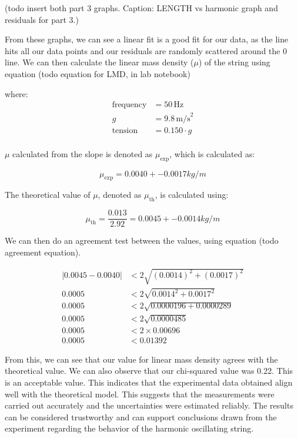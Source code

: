 \documentclass[11pt]{article}
\begin{document}
    (todo insert both part 3 graphs. Caption: LENGTH vs harmonic graph and residuals for part 3.)

    From these graphs, we can see a linear fit is a good fit for our data, as the line hits all our data points and our residuals are randomly scattered around the 0 line. We can then calculate the linear mass density ($\mu$) of the string using equation (todo equation for LMD, in lab notebook)
    
    where:
    \begin{align*}
    \text{frequency} &= 50 \, \text{Hz} \\
    g &= 9.8 \, \text{m/s}^2 \\
    \text{tension} &= 0.150 \cdot g\\
    \end{align*}
    
    $\mu$ calculated from the slope is denoted as $\mu_{\text{exp}}$, which is calculated as:
    
    \begin{equation}
    \mu_{\text{exp}} = 0.0040 +- 0.0017 kg/m
    \end{equation}
    
    The theoretical value of $\mu$, denoted as $\mu_{\text{th}}$, is calculated using:
    
    \begin{equation}
    \mu_{\text{th}} = \frac{0.013}{2.92} = 0.0045 +- 0.0014 kg/m
    \end{equation}

    We can then do an agreement test between the values, using equation (todo agreement equation).

    \begin{align*}
    |0.0045 - 0.0040| &< 2 \sqrt{(0.0014)^2 + (0.0017)^2} \\
    0.0005 &< 2 \sqrt{0.0014^2 + 0.0017^2} \\
    0.0005 &< 2 \sqrt{0.0000196 + 0.0000289} \\
    0.0005 &< 2 \sqrt{0.0000485} \\
    0.0005 &< 2 \times 0.00696 \\
    0.0005 &< 0.01392
    \end{align*}

    From this, we can see that our value for linear mass density agrees with the theoretical value. We can also observe that our chi-squared value was 0.22. This is an acceptable value. This indicates that the experimental data obtained align well with the theoretical model. This suggests that the measurements were carried out accurately and the uncertainties were estimated reliably. The results can be considered trustworthy and can support conclusions drawn from the experiment regarding the behavior of the harmonic oscillating string.
\end{document}
